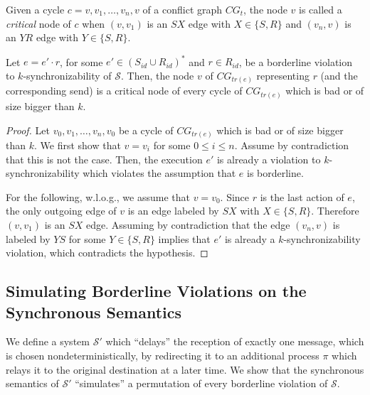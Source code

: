 Given a cycle $c = v,v_1,\ldots,v_n,v$ of a conflict graph $CG_t$, the node $v$ is called a \emph{critical} node of $c$ when $(v,v_1)$ is an $SX$ edge with $X\in \{S,R\}$ 
and $(v_n,v)$ is an $YR$ edge with $Y\in \{S,R\}$.

\begin{lemma}\label{lem:critical}
Let $e = e'\cdot r$, for some $e'\in (S_{id}\cup R_{id})^*$ and $r\in R_{id}$, be a borderline violation to $k$-synchronizability of $\mathcal{S}$. 
Then, the node $v$ of $CG_{tr(e)}$ representing $r$ (and the corresponding send) is a critical node of every cycle of 
$CG_{tr(e)}$ which is bad or of size bigger than $k$. %
\end{lemma}
\begin{proof}
Let $v_0,v_1,\ldots,v_n,v_0$ be a cycle of $CG_{tr(e)}$ which is bad or of size bigger than $k$. We first show that $v=v_i$ for some $0\leq i\leq n$. 
Assume by contradiction that this is not the case. Then, the execution $e'$ is already a violation to $k$-synchronizability which violates the assumption that $e$ is borderline.

For the following, w.l.o.g., we assume that $v=v_0$. Since $r$ is the last action of $e$, the only outgoing edge of $v$ is an edge labeled by $SX$ with $X\in \{S,R\}$. Therefore $(v,v_1)$ is an $SX$ edge. 
Assuming by contradiction that the edge $(v_n,v)$ is labeled by $YS$ for some $Y\in \{S,R\}$ implies that $e'$ is already a $k$-synchronizability violation, which contradicts the hypothesis.
\end{proof}


\subsection{Simulating Borderline Violations on the Synchronous Semantics}\label{ssec:verif2}

We define a system $\mathcal{S'}$ which ``delays'' the reception of exactly one message, which is chosen nondeterministically,
by redirecting it to an additional process $\pi$ which relays it to the original destination at a later time. We show that
the synchronous semantics of $\mathcal{S'}$ ``simulates'' a permutation of every borderline violation of 
$\mathcal{S}$. 

